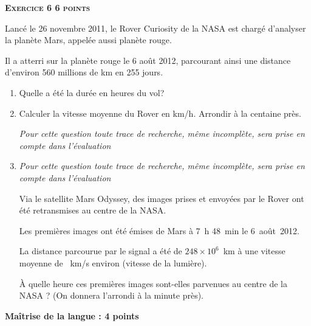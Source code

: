 \documentclass[10pt]{article}
\begin{document}
\bigskip

\textbf{\textsc{Exercice 6 \hfill 6 points}}

\medskip

Lancé le 26 novembre 2011, le Rover Curiosity de la NASA est chargé d'analyser la planète Mars, appelée aussi planète rouge.
 
Il a atterri sur la planète rouge le 6 août 2012, parcourant ainsi une distance d'environ 560 millions de km en 255 jours.

\medskip
 
\begin{enumerate}
\item Quelle a été la durée en heures du vol? 
\item Calculer la vitesse moyenne du Rover en km/h. Arrondir à la centaine près.
 
\emph{Pour cette question toute trace de recherche, même incomplète, sera prise en compte dans l'évaluation} 
\item \emph{Pour cette question toute trace de recherche, même incomplète, sera prise en compte dans l'évaluation}

Via le satellite Mars Odyssey, des images prises et envoyées par le Rover ont été retransmises au centre de la NASA.
 
Les premières images ont été émises de Mars à 7~h 48~min le 6~août~2012.
 
La distance parcourue par le signal a été de $248 \times 10^6$~km à une vitesse moyenne de ~km/s environ (vitesse de la lumière).
 
À quelle heure ces premières images sont-elles parvenues au centre de la NASA ? (On donnera l'arrondi à la minute près). 
\end{enumerate}

\medskip

\textbf{Maîtrise de la langue : 4 points}
\end{document}
